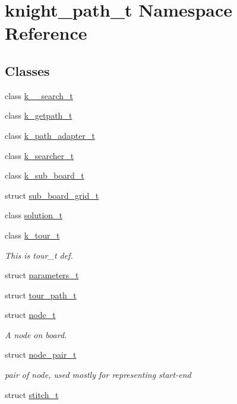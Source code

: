 \hypertarget{namespaceknight__path__t}{\section{knight\-\_\-path\-\_\-t \-Namespace \-Reference}
\label{namespaceknight__path__t}
}
\subsection*{\-Classes}
\begin{DoxyCompactItemize}
\item 
class \hyperlink{classknight__path__t_1_1k__32__search__t}{k\-\_\-\_\-search\-\_\-t}
\item 
class \hyperlink{classknight__path__t_1_1k__getpath__t}{k\-\_\-getpath\-\_\-t}
\item 
class \hyperlink{classknight__path__t_1_1k__path__adapter__t}{k\-\_\-path\-\_\-adapter\-\_\-t}
\item 
class \hyperlink{classknight__path__t_1_1k__searcher__t}{k\-\_\-searcher\-\_\-t}
\item 
class \hyperlink{classknight__path__t_1_1k__sub__board__t}{k\-\_\-sub\-\_\-board\-\_\-t}
\item 
struct \hyperlink{structknight__path__t_1_1sub__board__grid__t}{sub\-\_\-board\-\_\-grid\-\_\-t}
\item 
class \hyperlink{classknight__path__t_1_1solution__t}{solution\-\_\-t}
\item 
class \hyperlink{classknight__path__t_1_1k__tour__t}{k\-\_\-tour\-\_\-t}
\begin{DoxyCompactList}\small\item\em \-This is tour\-\_\-t def. \end{DoxyCompactList}\item 
struct \hyperlink{structknight__path__t_1_1parameters__t}{parameters\-\_\-t}
\item 
struct \hyperlink{structknight__path__t_1_1tour__path__t}{tour\-\_\-path\-\_\-t}
\item 
struct \hyperlink{structknight__path__t_1_1node__t}{node\-\_\-t}
\begin{DoxyCompactList}\small\item\em \-A node on board. \end{DoxyCompactList}\item 
struct \hyperlink{structknight__path__t_1_1node__pair__t}{node\-\_\-pair\-\_\-t}
\begin{DoxyCompactList}\small\item\em pair of node, used mostly for representing start-\/end \end{DoxyCompactList}\item 
struct \hyperlink{structknight__path__t_1_1stitch__t}{stitch\-\_\-t}
\end{DoxyCompactItemize}
